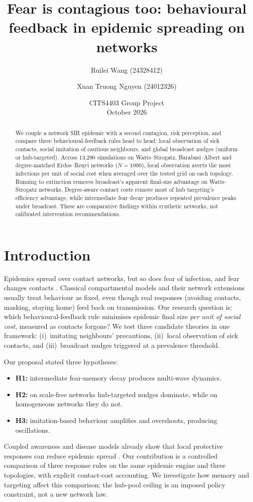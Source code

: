\documentclass[11pt,a4paper]{article}
\title{Fear is contagious too: behavioural feedback in epidemic spreading on networks}
\author{Ruilei Wang (24328412) \and Xuan Truong Nguyen (24012326)}
\date{CITS4403 Group Project \\ October 2026}
\begin{document}
\maketitle

\begin{abstract}
\normalsize
We couple a network SIR epidemic with a second contagion, risk perception,
and compare three behavioural-feedback rules head to head: local observation
of sick contacts, social imitation of cautious neighbours, and global
broadcast nudges (uniform or hub-targeted). Across 13,290 simulations on
Watts--Strogatz, Barabasi--Albert and degree-matched Erdos--Renyi networks
($N=1000$), local observation averts the most infections per unit of social
cost when averaged over the tested grid on each topology. Running to
extinction removes broadcast's apparent final-size advantage on
Watts--Strogatz networks. Degree-aware contact costs remove most of hub
targeting's efficiency advantage, while intermediate fear decay produces
repeated prevalence peaks under broadcast. These are comparative findings
within synthetic networks, not calibrated intervention recommendations.
\end{abstract}

\section{Introduction}
Epidemics spread over contact networks, but so does fear of infection, and
fear changes contacts \cite{Funk2010}. Classical compartmental models
\cite{Kermack1927} and their network extensions \cite{Newman2002} usually
treat behaviour as fixed, even though real responses (avoiding contacts,
masking, staying home) feed back on transmission. Our research question is:
which behavioural-feedback rule minimises epidemic final size \emph{per unit
of social cost}, measured as contacts forgone? We test three candidate
theories in one framework: (i)~imitating neighbours' precautions, (ii)~local
observation of sick contacts, and (iii)~broadcast nudges triggered at a
prevalence threshold.

Our proposal stated three hypotheses:
\begin{itemize}
\item \textbf{H1:} intermediate fear-memory decay produces multi-wave
dynamics.
\item \textbf{H2:} on scale-free networks hub-targeted nudges dominate,
while on homogeneous networks they do not.
\item \textbf{H3:} imitation-based behaviour amplifies and overshoots,
producing oscillations.
\end{itemize} Coupled awareness and disease models already show that local
protective responses can reduce epidemic spread \cite{Funk2009}. Our
contribution is a controlled comparison of three response rules on the same
epidemic engine and three topologies, with explicit contact-cost accounting.
We investigate how memory and targeting affect this comparison; the
hub-pool ceiling is an imposed policy constraint, not a new network law.
\end{document}
